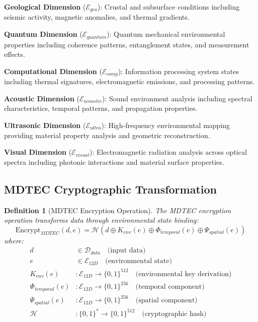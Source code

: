 \documentclass[12pt,a4paper]{article}
\newtheorem{definition}[theorem]{Definition}
\begin{document}
\textbf{Geological Dimension} ($\mathcal{E}_{geo}$): Crustal and subsurface conditions including seismic activity, magnetic anomalies, and thermal gradients.

\textbf{Quantum Dimension} ($\mathcal{E}_{quantum}$): Quantum mechanical environmental properties including coherence patterns, entanglement states, and measurement effects.

\textbf{Computational Dimension} ($\mathcal{E}_{comp}$): Information processing system states including thermal signatures, electromagnetic emissions, and processing patterns.

\textbf{Acoustic Dimension} ($\mathcal{E}_{acoustic}$): Sound environment analysis including spectral characteristics, temporal patterns, and propagation properties.

\textbf{Ultrasonic Dimension} ($\mathcal{E}_{ultra}$): High-frequency environmental mapping providing material property analysis and geometric reconstruction.

\textbf{Visual Dimension} ($\mathcal{E}_{visual}$): Electromagnetic radiation analysis across optical spectra including photonic interactions and material surface properties.

\subsection{MDTEC Cryptographic Transformation}

\begin{definition}[MDTEC Encryption Operation]
The MDTEC encryption operation transforms data through environmental state binding:
\begin{equation}
\text{Encrypt}_{MDTEC}(d, e) = \mathcal{H}(d \oplus K_{env}(e) \oplus \Phi_{temporal}(e) \oplus \Psi_{spatial}(e))
\end{equation}
where:
\begin{align}
d &\in \mathcal{D}_{data} \quad \text{(input data)} \\
e &\in \mathcal{E}_{12D} \quad \text{(environmental state)} \\
K_{env}(e) &: \mathcal{E}_{12D} \to \{0,1\}^{512} \quad \text{(environmental key derivation)} \\
\Phi_{temporal}(e) &: \mathcal{E}_{12D} \to \{0,1\}^{256} \quad \text{(temporal component)} \\
\Psi_{spatial}(e) &: \mathcal{E}_{12D} \to \{0,1\}^{256} \quad \text{(spatial component)} \\
\mathcal{H} &: \{0,1\}^* \to \{0,1\}^{512} \quad \text{(cryptographic hash)}
\end{align}
\end{definition}
\end{document}
